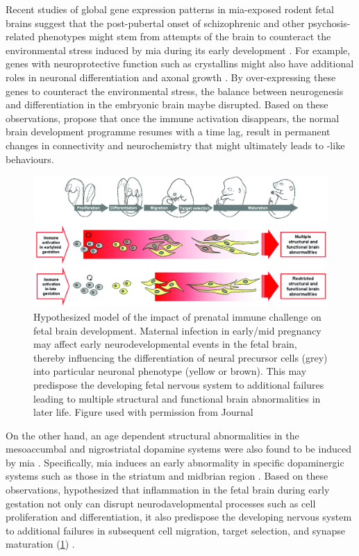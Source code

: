 	Recent studies of global gene expression patterns in \gls{mia}-exposed rodent fetal brains \citep{Oskvig2012,Garbett2012a} suggest that the post-pubertal onset of schizophrenic and other psychosis-related phenotypes might stem from attempts of the brain to counteract the environmental stress induced by \gls{mia} during its early development \citep{Garbett2012a}.
	For example, genes with neuroprotective function such as crystallins might also have additional roles in neuronal differentiation and axonal growth \citep{Garbett2012a}. 
	By over-expressing these genes to counteract the environmental stress, the balance between neurogenesis and differentiation in the embryonic brain maybe disrupted. 
	Based on these observations, \citet{Garbett2012a} propose that once the immune activation disappears, the normal brain development programme resumes with a time lag, result in permanent changes in connectivity and neurochemistry that might ultimately leads to -like behaviours.
	\begin{figure}
		\centering
		\includegraphics[width=\textwidth]{figure/mia_impact.jpg}
		\caption[Hypothesized model of the impact of prenatal immune challenge on fetal brain development]{Hypothesized model of the impact of prenatal immune challenge on fetal brain development.
			Maternal infection in early/mid pregnancy may affect early neurodevelopmental events in the fetal brain, thereby influencing the differentiation of neural precursor cells (grey) into particular neuronal phenotype (yellow or brown).
			This may predispose the developing fetal nervous system to additional failures leading to multiple structural and functional brain abnormalities in later life.
			Figure used with permission from Journal \citep{Meyer2007a}}
		\label{fig:miaEffect}
	\end{figure}
	
	On the other hand, an age dependent structural abnormalities in the mesoaccumbal and nigrostriatal dopamine systems were also found to be induced by \gls{mia} \citep{Vuillermot2010}.
	Specifically, \gls{mia} induces an early abnormality in specific dopaminergic systems such as those in the striatum and midbrian region \citep{Vuillermot2010}.
	Based on these observations, \citet{Meyer2007a} hypothesized that inflammation in the fetal brain during early gestation not only can disrupt neurodavelopmental processes such as cell proliferation and differentiation, it also predispose the developing nervous system to additional failures in subsequent cell migration, target selection, and synapse maturation (\cref{fig:miaEffect}) \citep{Meyer2007a}.
		
